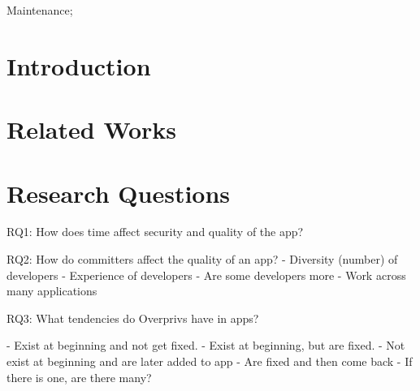 \documentclass{sig-alternate}
\begin{document}
Maintenance;









\section{Introduction}








\section{Related Works}
\label{sec: relatedworks}


%






\section{Research Questions}
\label{sec: researchquestions}


RQ1: How does time affect security and quality of the app?



RQ2: How do committers affect the quality of an app?
- Diversity (number) of developers
- Experience of developers
- Are some developers more
- Work across many applications





RQ3: What tendencies do Overprivs have in apps?

- Exist at beginning and not get fixed.
- Exist at beginning, but are fixed.
- Not exist at beginning and are later added to app
- Are fixed and then come back
- If there is one, are there many?
\end{document}
